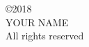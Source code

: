 \vspace*{7in}
\thispagestyle{empty}
\noindent
\setlength{\baselineskip}{0.625 \baselineskip}
\begin{center}
  \copyright 2018 \\
  \vspace{0.05in}
  YOUR NAME \\
  All rights reserved
\end{center}
\setlength{\baselineskip}{1.6 \baselineskip}


\clearpage
